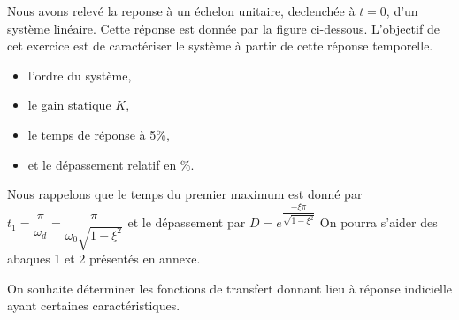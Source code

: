 Nous avons relevé la reponse à un échelon unitaire, 
declenchée à $t=0$, d'un système linéaire.
Cette réponse est donnée par la figure ci-dessous.
L'objectif de cet exercice est de caractériser le système 
à partir de cette réponse temporelle.
\begin{center}
    
\end{center}
\begin{itemize}
    \item l'ordre du système,
    \item le gain statique $K$,
    \item le temps de réponse à 5\%,
    \item et le dépassement relatif en \%.
\end{itemize}
Nous rappelons que le temps du premier maximum est 
donné par $t_1=\dfrac{\pi}{\omega_d}=\dfrac{\pi}{\omega_0\sqrt{1-\xi^2}}$
et le dépassement par $D=e^{\dfrac{-\xi\pi}{\sqrt{1-\xi^2}}}$
On pourra s'aider des abaques 1 et 2 présentés en annexe.

\clearpage
On souhaite déterminer les fonctions de transfert donnant lieu à réponse 
indicielle ayant certaines caractéristiques.
\acpl


